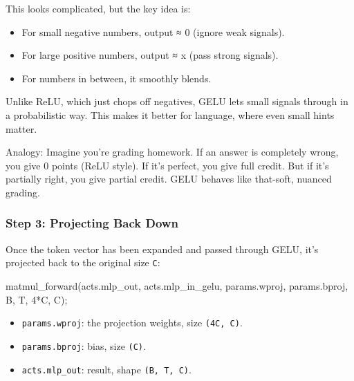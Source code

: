 \documentclass[
  letterpaper,
  DIV=11,
  numbers=noendperiod]{scrreprt}
\newenvironment{Shaded}{\begin{snugshade}}{\end{snugshade}}
\newcommand{\DecValTok}[1]{\textcolor[rgb]{0.68,0.00,0.00}{#1}}
\newcommand{\NormalTok}[1]{\textcolor[rgb]{0.00,0.23,0.31}{#1}}
\newcommand{\OperatorTok}[1]{\textcolor[rgb]{0.37,0.37,0.37}{#1}}
\providecommand{\tightlist}{%
  \setlength{\itemsep}{0pt}\setlength{\parskip}{0pt}}
\begin{document}
This looks complicated, but the key idea is:

\begin{itemize}
\tightlist
\item
  For small negative numbers, output ≈ 0 (ignore weak signals).
\item
  For large positive numbers, output ≈ x (pass strong signals).
\item
  For numbers in between, it smoothly blends.
\end{itemize}

Unlike ReLU, which just chops off negatives, GELU lets small signals
through in a probabilistic way. This makes it better for language, where
even small hints matter.

Analogy: Imagine you're grading homework. If an answer is completely
wrong, you give 0 points (ReLU style). If it's perfect, you give full
credit. But if it's partially right, you give partial credit. GELU
behaves like that-soft, nuanced grading.

\subsubsection{Step 3: Projecting Back
Down}\label{step-3-projecting-back-down}

Once the token vector has been expanded and passed through GELU, it's
projected back to the original size \texttt{C}:

\begin{Shaded}
\begin{Highlighting}[]
\NormalTok{matmul\_forward}\OperatorTok{(}\NormalTok{acts}\OperatorTok{.}\NormalTok{mlp\_out}\OperatorTok{,}\NormalTok{ acts}\OperatorTok{.}\NormalTok{mlp\_in\_gelu}\OperatorTok{,}\NormalTok{ params}\OperatorTok{.}\NormalTok{wproj}\OperatorTok{,}\NormalTok{ params}\OperatorTok{.}\NormalTok{bproj}\OperatorTok{,}\NormalTok{ B}\OperatorTok{,}\NormalTok{ T}\OperatorTok{,} \DecValTok{4}\OperatorTok{*}\NormalTok{C}\OperatorTok{,}\NormalTok{ C}\OperatorTok{);}
\end{Highlighting}
\end{Shaded}

\begin{itemize}
\tightlist
\item
  \texttt{params.wproj}: the projection weights, size \texttt{(4C,\ C)}.
\item
  \texttt{params.bproj}: bias, size \texttt{(C)}.
\item
  \texttt{acts.mlp\_out}: result, shape \texttt{(B,\ T,\ C)}.
\end{itemize}
\end{document}
